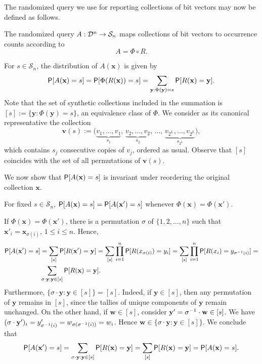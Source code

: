 \documentclass[11pt,draft]{article}
\newcommand{\Dsp}{\mathcal{D}}
\newcommand{\Ssp}{\mathcal{S}}
\newcommand{\xv}{\mathbf{x}}
\newcommand{\yv}{\mathbf{y}}
\newcommand{\vv}{\mathbf{v}}
\begin{document}
The randomized query we use for reporting collections of bit vectors may now
be defined as follows.

\begin{defn}
The randomized query $\map{A}{\Dsp^n}{\Ssp_n}$ maps collections of bit vectors
to occurrence counts according to
\[ A = \Phi \circ R. \]
\end{defn}

For $s\in\Ssp_n$, the distribution of $A(\xv)$ is given by
\begin{equation}\label{eq:Adist}
\P[A(\xv) = s] = \P[\Phi(R(\xv)) = s]
= \sum_{\yv:\Phi(\yv) = s} \P[R(\xv) = \yv]
.
\end{equation}
Note that the set of synthetic collections included in the summation is
$[s] := \{\yv:\Phi(\yv) = s\}$, an equivalence class of $\Phi$.
We consider as its canonical representative the collection
\[ \vv(s) := \big(\underbrace{v_1,\dots,v_1}_{s_1},\,
   \underbrace{v_2,\dots,v_2}_{s_2},\,\dots,\,
   \underbrace{v_{2^L},\dots,v_{2^L}}_{s_{2^L}}\big), \]
which contains $s_j$ consecutive copies of $v_j$, ordered as usual.
Observe that $[s]$ coincides with the set of all permutations of $\vv(s)$.

We now show that $\P[A(\xv) = s]$ is invariant under reordering the original
collection $\xv$.

\begin{prop}
For fixed $s\in\Ssp_n$, $\P[A(\xv) = s] = \P[A(\xv') = s]$ whenever
$\Phi(\xv) = \Phi(\xv')$.
\end{prop}
\begin{pf}
If $\Phi(\xv) = \Phi(\xv')$, there is a permutation $\sigma$ of
$\{1,2,\dots,n\}$ such that
$\xv'_i = \xv_{\sigma(i)}$, $1 \leq i \leq n$.
Hence,
\begin{align*}
\P[A(\xv') = s] &= \sum_{[s]} \P[R(\xv') = \yv] =
\sum_{[s]} \prod_{i = 1}^n \P[R(x_{\sigma(i)}) = y_i] =
\sum_{[s]} \prod_{i = 1}^n \P[R(x_{i}) = y_{\inv{\sigma}(i)}] = \\
&\sum_{\sigma\cdot\yv : \yv \in [s]} \P[R(\xv) = \yv].
\end{align*}
Furthermore, $\{\sigma\cdot\yv : \yv \in [s]\} = [s]$.
Indeed, if $\yv\in [s]$, then any permutation of $\yv$ remains in $[s]$,
since the tallies of unique components of $\yv$ remain unchanged.
On the other hand, if $\mathbf{w} \in [s]$, consider
$\yv' = \inv{\sigma}\cdot\mathbf{w} \in [s]$.
We have $(\sigma\cdot\yv')_i = y'_{\inv{\sigma}(i)} =
w_{\sigma(\inv{\sigma}(i))} = w_i$.
Hence $\mathbf{w} \in \{\sigma\cdot\yv : \yv \in [s]\}$.
We conclude that
\[ \P[A(\xv') = s] = \sum_{\sigma\cdot\yv : \yv \in [s]} \P[R(\xv) = \yv] =
\sum_{[s]} \P[R(\xv) = \yv] = \P[A(\xv) = s]. \]
\end{pf}
\end{document}
